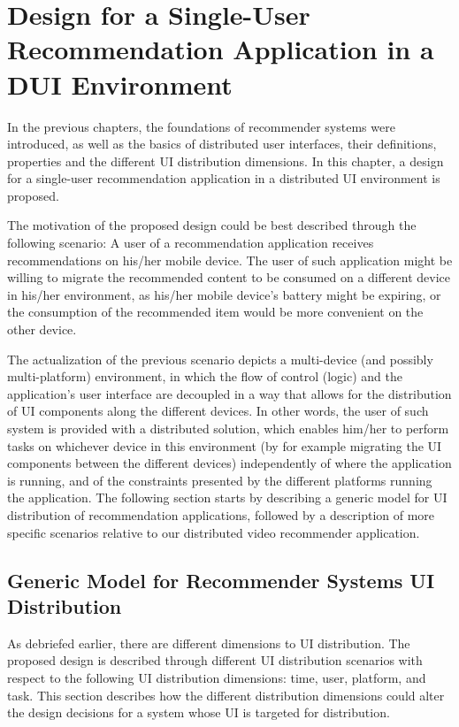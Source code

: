\chapter{Design for a Single-User Recommendation Application in a DUI Environment}\label{chapter:design}

In the previous chapters, the foundations of recommender systems were introduced, as well as the basics of distributed user interfaces, their definitions, properties and the different UI distribution dimensions. In this chapter, a design for a single-user recommendation application in a distributed UI environment is proposed.

The motivation of the proposed design could be best described through the following scenario: A user of a recommendation application receives recommendations on his/her mobile device. The user of such application might be willing to migrate the recommended content to be consumed on a different device in his/her environment, as his/her mobile device's battery might be expiring, or the consumption of the recommended item would be more convenient on the other device.

The actualization of the previous scenario depicts a multi-device (and possibly
multi-platform) environment, in which the flow of control (logic) and
the application's user interface are decoupled in a way that allows for the
distribution of UI components along the different devices. In other words, the user of such system is provided with a distributed solution, which enables him/her to perform tasks on whichever device in this environment (by for example migrating the UI components between the different devices) independently of where the application is running, and of the constraints presented by the different platforms running the application.
The following section starts by describing a generic model for UI distribution of recommendation applications, followed by a description of more specific scenarios relative to our distributed video recommender application.
\section{Generic Model for Recommender Systems UI Distribution}
As debriefed earlier, there are different dimensions to UI distribution. The proposed design is described through different UI distribution scenarios with respect to the following UI distribution dimensions: time, user, platform, and task. This section describes how the different distribution dimensions could alter the design decisions for a system whose UI is targeted for distribution. 
